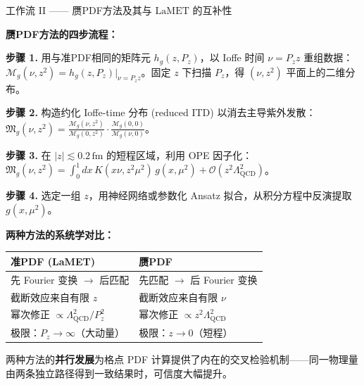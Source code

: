\documentclass[10pt,aspectratio=169]{beamer}
\newcommand{\lqcd}{\Lambda_{\mathrm{QCD}}}
\newcommand{\LaMET}{\mathrm{LaMET}}
\newcommand{\fm}{\,\mathrm{fm}}
\begin{document}
\begin{frame}{工作流 II —— 赝PDF方法及其与 $\LaMET$ 的互补性}

  \textbf{赝PDF方法的四步流程：}

  \textbf{步骤 1.} 用与准PDF相同的矩阵元 $h_g(z, P_z)$，以 Ioffe 时间 $\nu = P_z z$ 重组数据：
  $\mathcal{M}_g(\nu, z^2) = h_g(z, P_z)|_{\nu = P_z z}$。固定 $z$ 下扫描 $P_z$，得 $(\nu, z^2)$ 平面上的二维分布。

  \textbf{步骤 2.} 构造约化 Ioffe-time 分布 (reduced ITD) 以消去主导紫外发散：
  $\mathfrak{M}_g(\nu, z^2) = \frac{\mathcal{M}_g(\nu, z^2)}{\mathcal{M}_g(0, z^2)} \cdot \frac{\mathcal{M}_g(0, 0)}{\mathcal{M}_g(\nu, 0)}$。

  \textbf{步骤 3.} 在 $|z| \lesssim 0.2\fm$ 的短程区域，利用 OPE 因子化：
  $\mathfrak{M}_g(\nu, z^2) = \int_0^1 dx\, K(x\nu, z^2\mu^2)\, g(x,\mu^2) + \mathcal{O}(z^2\lqcd^2)$。

  \textbf{步骤 4.} 选定一组 $z$，用神经网络或参数化 Ansatz 拟合，从积分方程中反演提取 $g(x,\mu^2)$。

  \vspace{6pt}
  \textbf{两种方法的系统学对比：}
  \begin{center}
  \begin{tabular}{p{}|p{}}
    \hline
    \textbf{准PDF (LaMET)} & \textbf{赝PDF} \\
    \hline
    先 Fourier 变换 $\to$ 后匹配 & 先匹配 $\to$ 后 Fourier 变换 \\
    截断效应来自有限 $z$ & 截断效应来自有限 $\nu$ \\
    幂次修正 $\propto \lqcd^2/P_z^2$ & 幂次修正 $\propto z^2\lqcd^2$ \\
    极限：$P_z \to \infty$（大动量） & 极限：$z \to 0$（短程） \\
    \hline
  \end{tabular}
  \end{center}

  两种方法的\textbf{并行发展}为格点 PDF 计算提供了内在的交叉检验机制——同一物理量由两条独立路径得到一致结果时，可信度大幅提升。
\end{frame}
\end{document}
